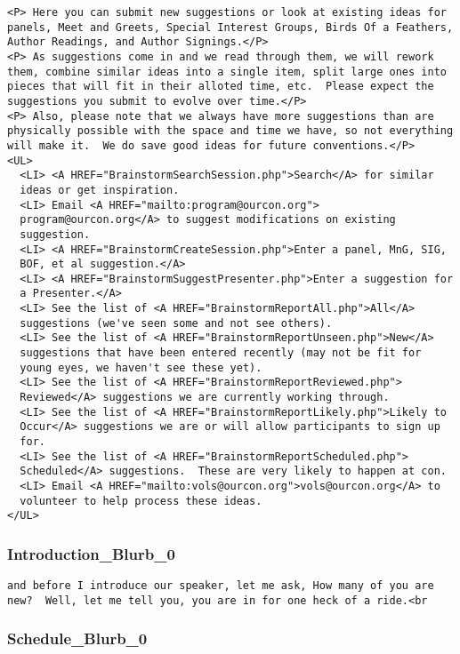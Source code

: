 \documentclass[tablesignature]{scrartcl}
\begin{document}
\begin{verbatim}
<P> Here you can submit new suggestions or look at existing ideas for
panels, Meet and Greets, Special Interest Groups, Birds Of a Feathers,
Author Readings, and Author Signings.</P>
<P> As suggestions come in and we read through them, we will rework
them, combine similar ideas into a single item, split large ones into
pieces that will fit in their alloted time, etc.  Please expect the
suggestions you submit to evolve over time.</P>
<P> Also, please note that we always have more suggestions than are
physically possible with the space and time we have, so not everything
will make it.  We do save good ideas for future conventions.</P>
<UL> 
  <LI> <A HREF="BrainstormSearchSession.php">Search</A> for similar
  ideas or get inspiration.
  <LI> Email <A HREF="mailto:program@ourcon.org">
  program@ourcon.org</A> to suggest modifications on existing
  suggestion.
  <LI> <A HREF="BrainstormCreateSession.php">Enter a panel, MnG, SIG,
  BOF, et al suggestion.</A>
  <LI> <A HREF="BrainstormSuggestPresenter.php">Enter a suggestion for
  a Presenter.</A>
  <LI> See the list of <A HREF="BrainstormReportAll.php">All</A>
  suggestions (we've seen some and not see others).
  <LI> See the list of <A HREF="BrainstormReportUnseen.php">New</A>
  suggestions that have been entered recently (may not be fit for
  young eyes, we haven't see these yet).
  <LI> See the list of <A HREF="BrainstormReportReviewed.php">
  Reviewed</A> suggestions we are currently working through.
  <LI> See the list of <A HREF="BrainstormReportLikely.php">Likely to
  Occur</A> suggestions we are or will allow participants to sign up
  for.
  <LI> See the list of <A HREF="BrainstormReportScheduled.php">
  Scheduled</A> suggestions.  These are very likely to happen at con.
  <LI> Email <A HREF="mailto:vols@ourcon.org">vols@ourcon.org</A> to
  volunteer to help process these ideas.
</UL>
\end{verbatim}
\subsubsection{Introduction\_{}Blurb\_{}0}
\label{sec-3_5_2}

\begin{verbatim}
and before I introduce our speaker, let me ask, How many of you are
new?  Well, let me tell you, you are in for one heck of a ride.<br
\end{verbatim}
\subsubsection{Schedule\_{}Blurb\_{}0}
\label{sec-3_5_3}
\end{document}
